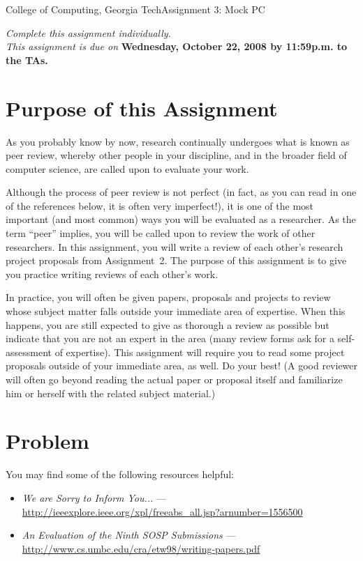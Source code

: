\documentclass[11pt]{article}
\begin{document}


{College of Computing, Georgia Tech}{Assignment 3: Mock PC}

{\em Complete this assignment individually. \\  This
  assignment is due on} {\bf Wednesday, October 22, 2008 by 11:59p.m. to
  the TAs.}

\section{Purpose of this Assignment}



As you probably know by now, research continually undergoes what is
known as peer review, whereby other people in your discipline, and in
the broader field of computer science, are called upon to evaluate your
work.  

Although the process of peer review is not perfect (in fact, as you can
read in one of the references below, it is often very imperfect!), it is
one of the most important (and most common) ways you will be evaluated
as a researcher.  As the term ``peer'' implies, you will be called upon
to review the work of other researchers.  In this assignment, you will
write a review of each other's research project proposals from
Assignment~2.  The purpose of this assignment is to give you practice
writing reviews of each other's work.

In practice, you will often be given papers, proposals and projects to
review whose subject matter falls outside your immediate area of
expertise.  When this happens, you are still expected to give as
thorough a review as possible but indicate that you are not an expert in
the area (many review forms ask for a self-assessment of expertise).
This assignment will require you to read some project proposals outside
of your immediate area, as well.  Do your best!  (A good reviewer will
often go beyond reading the actual paper or proposal itself and
familiarize him or herself with the related subject material.)

\section{Problem}



You may find some of the following resources helpful:

\begin{itemize}
\itemsep=-1pt
\item {\em We are Sorry to Inform You...} --- \\
  \url{http://ieeexplore.ieee.org/xpl/freeabs_all.jsp?arnumber=1556500}
\item {\em An Evaluation of the Ninth SOSP Submissions} --- \\
  \url{http://www.cs.umbc.edu/cra/etw98/writing-papers.pdf}
\end{itemize}
\end{document}

